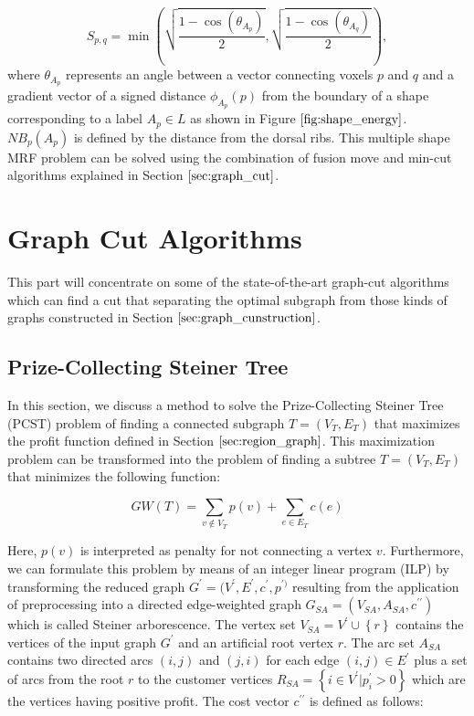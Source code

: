\documentclass{SMBV12}
\begin{document}
\begin{equation}
S_{p, q} = \min \left( \sqrt{\dfrac{1 - \cos(\theta_{A_p})}{2}}, \sqrt{\dfrac{1 - \cos(\theta_{A_q})}{2}} \right),
\end{equation}
where $\theta_{A_p}$ represents an angle between a vector connecting voxels $p$ and $q$ and a gradient vector of a signed distance $\phi_{A_p}(p)$ from the boundary of a shape corresponding to a label $A_p \in L$ as shown in Figure $\ref{fig:shape_energy}$. $NB_p(A_p)$ is defined by the distance from the dorsal ribs. This multiple shape MRF problem can be solved using the combination of fusion move and min-cut algorithms explained in Section $\ref{sec:graph_cut}$.

\section{Graph Cut Algorithms}
\label{sec:graph_cut_algorithms}
This part will concentrate on some of the state-of-the-art graph-cut algorithms which can find a cut that separating the optimal subgraph from those kinds of graphs constructed in Section $\ref{sec:graph_cunstruction}$.

\subsection{Prize-Collecting Steiner Tree}
\label{sec:branch_and_cut}

In this section, we discuss a method to solve the Prize-Collecting Steiner Tree (PCST) problem \cite{ljubic2006algorithmic} of finding a connected subgraph $T = (V_T, E_T)$ that maximizes the profit function defined in Section $\ref{sec:region_graph}$. This maximization problem can be transformed into the problem of finding a subtree $T = (V_T, E_T)$ that minimizes the following function:

\begin{equation}
GW(T) = \sum\limits_{v \notin V_T} p(v) + \sum\limits_{e \in E_T} c(e)
\end{equation}

Here, $p(v)$ is interpreted as penalty for not connecting a vertex $v$. Furthermore, we can formulate this problem by means of an integer linear program (ILP) by transforming the reduced graph $G^{\prime} = (V^{\prime}, E^{\prime}, c^{\prime}, p^{\prime)}$ resulting from the application of preprocessing into a directed edge-weighted graph $G_{SA} = (V_{SA}, A_{SA}, c^{\prime \prime})$ which is called Steiner arborescence. The vertex set $V_{SA} = V^{\prime} \cup \left\lbrace r \right\rbrace $ contains the vertices of the input graph $G^{\prime}$ and an artificial root vertex $r$. The arc set $A_{SA}$ contains two directed arcs $(i, j)$ and $(j, i)$ for each edge $(i, j) \in E^{\prime}$ plus a set of arcs from the root $r$ to the customer vertices $R_{SA} = \left\lbrace i \in V^{\prime} \lvert p_i^{\prime} > 0 \right\rbrace $ which are the vertices having positive profit. The cost vector $c^{\prime \prime}$ is defined as follows:
\end{document}
